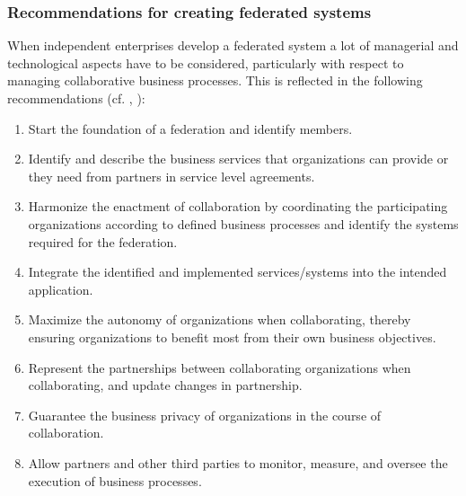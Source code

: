 \subsubsection{\textbf{Recommendations for creating federated systems}}
When independent enterprises develop a federated system a lot of managerial and technological aspects have to be considered, particularly with respect to managing collaborative business processes. This is reflected in the following recommendations (cf. \cite{book:PMThirdWave} , \cite{ChallengesDistPM} ):
\begin{enumerate}
	\item Start the foundation of a federation and identify members.
	\item Identify and describe the business services that organizations can provide or they need from partners in service level agreements.
	\item Harmonize the enactment of collaboration by coordinating the participating organizations according to defined business processes and identify the systems required for the federation.
	\item Integrate the identified and implemented services/systems into the intended application.
	\item Maximize the autonomy of organizations when collaborating, thereby ensuring organizations to benefit most from their own business objectives.
	\item Represent the partnerships between collaborating organizations when collaborating, and update changes in partnership.
	\item Guarantee the business privacy of organizations in the course of collaboration.
	\item Allow partners and other third parties to monitor, measure, and oversee the execution of business processes.
\end{enumerate}


